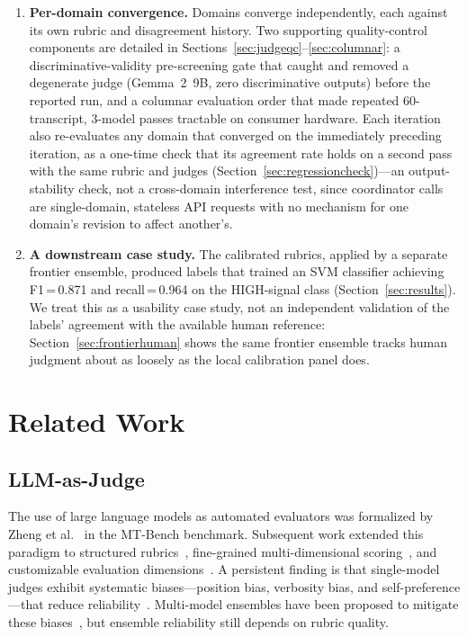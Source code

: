 \documentclass[11pt]{article}
\begin{document}
\begin{enumerate}[leftmargin=*, label=\arabic*.]
\item \textbf{Per-domain convergence.} Domains converge independently, each
against its own rubric and disagreement history. Two supporting
quality-control components are detailed in
Sections~\ref{sec:judgeqc}--\ref{sec:columnar}: a discriminative-validity
pre-screening gate that caught and removed a degenerate judge (Gemma~2~9B,
zero discriminative outputs) before the reported run, and a columnar
evaluation order that made repeated 60-transcript, 3-model passes tractable
on consumer hardware. Each iteration also re-evaluates any domain that
converged on the immediately preceding iteration, as a one-time check that
its agreement rate holds on a second pass with the same rubric and judges
(Section~\ref{sec:regressioncheck})---an output-stability check, not a
cross-domain interference test, since coordinator calls are single-domain,
stateless API requests with no mechanism for one domain's revision to
affect another's.

\item \textbf{A downstream case study.} The calibrated rubrics, applied by a
separate frontier ensemble, produced labels that trained an SVM classifier
achieving F1\,=\,0.871 and recall\,=\,0.964 on the HIGH-signal class
(Section~\ref{sec:results}). We treat this as a usability case study, not an
independent validation of the labels' agreement with the available human
reference: Section~\ref{sec:frontierhuman} shows the same frontier
ensemble tracks human judgment about as loosely as the local calibration
panel does.

\end{enumerate}

\section{Related Work}

\subsection{LLM-as-Judge}

The use of large language models as automated evaluators was formalized by
Zheng et al.~\cite{zheng2023judging} in the MT-Bench benchmark. Subsequent
work extended this paradigm to structured rubrics~\cite{liu2023geval},
fine-grained multi-dimensional scoring~\cite{kim2024prometheus}, and
customizable evaluation dimensions~\cite{fu2023gptscore}. A persistent finding is
that single-model judges exhibit systematic biases---position bias, verbosity
bias, and self-preference---that reduce
reliability~\cite{zheng2023judging, shi2024judging}. Multi-model ensembles have been proposed to
mitigate these biases~\cite{chan2023chateval}, but ensemble reliability still
depends on rubric quality.
\end{document}
